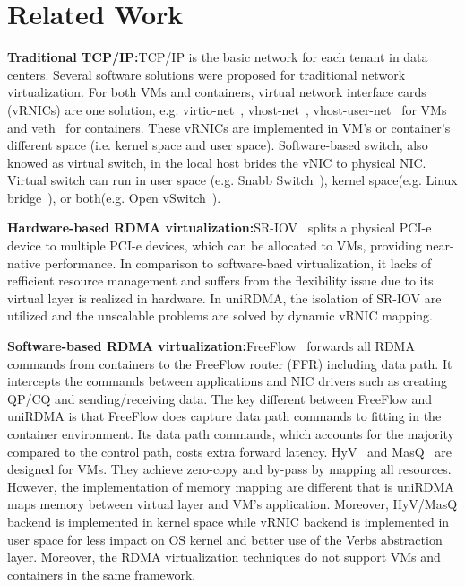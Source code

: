 \section{Related Work} \label{relatedwork}

\textbf{Traditional TCP/IP:}\qquad TCP/IP is the basic network for each tenant in data centers. Several software solutions were proposed for traditional network virtualization. For both VMs and containers, virtual network interface cards (vRNICs) are one solution, e.g. virtio-net~\cite{virtio-russell2008}, vhost-net~\cite{vhost-net},  vhost-user-net~\cite{vhost-user-net} for VMs and veth~\cite{veth} for containers. These vRNICs are implemented in VM's or container's different space (i.e. kernel space and user space). Software-based switch, also knowed as virtual switch, in the local host brides the vNIC to physical NIC. Virtual switch can run in user space (e.g. Snabb Switch~\cite{snabb}), kernel space(e.g. Linux bridge~\cite{linux-bridge}), or both(e.g. Open vSwitch~\cite{ovs-2015}). 

\textbf{Hardware-based RDMA virtualization:}\qquad SR-IOV~\cite{sr-iov} splits a physical PCI-e device to multiple PCI-e devices, which can be allocated to VMs, providing near-native performance. In comparison to software-baed virtualization, it lacks of refficient resource management and suffers from the flexibility issue due to its virtual layer is realized in hardware. In uniRDMA, the isolation of SR-IOV are utilized and the unscalable problems are solved by dynamic vRNIC mapping. 

\textbf{Software-based RDMA virtualization:}\qquad FreeFlow~\cite{kim2019freeflow} forwards all RDMA commands from containers to the FreeFlow router (FFR) including data path. It intercepts the commands between applications and NIC drivers such as creating QP/CQ and sending/receiving data. The key different between FreeFlow and uniRDMA is that FreeFlow does capture data path commands to fitting in the container environment. Its data path commands, which accounts for the majority compared to the control path, costs extra forward latency. HyV~\cite{pfefferle2015hybrid} and MasQ~\cite{he2020masq} are designed for VMs. They achieve zero-copy and by-pass by mapping all resources. However, the implementation of memory mapping are different that is uniRDMA maps memory between virtual layer and VM's application. Moreover, HyV/MasQ backend is implemented in kernel space while \sys vRNIC backend is implemented in user space for less impact on OS kernel and better use of the Verbs abstraction layer. Moreover, the RDMA virtualization techniques do not support VMs and containers in the same framework.